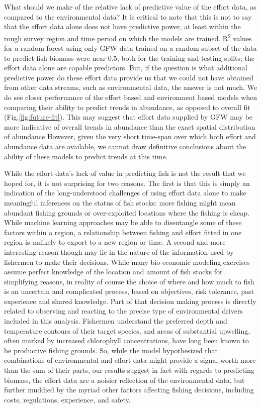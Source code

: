 \documentclass[twoside,12pt,final]{ucthesis-CA2012}
\begin{document}
\begin{ucmainmatter}
What should we make of the relative lack of predictive value of the
effort data, as compared to the environmental data? It is critical to
note that this is not to say that the effort data alone does not have
predictive power, at least within the rough survey region and time
period on which the models are trained. R\textsuperscript{2} values for
a random forest using only GFW data trained on a random subset of the
data to predict fish biomass were near 0.5, both for the training and
testing splits; the effort data alone are capable predictors. But, if
the question is what additional predictive power do these effort data
provide us that we could not have obtained from other data streams, such
as environmental data, the answer is not much. We do see closer
performance of the effort based and environment based models when
comparing their ability to predict trends in abundance, as opposed to
overall fit (Fig.\ref{fig:future-fit}). This may suggest that effort
data supplied by GFW may be more indicative of overall trends in
abundance than the exact spatial distribution of abundance However,
given the very short time-span over which both effort and abundance data
are available, we cannot draw definitive conclusions about the ability
of these models to predict trends at this time.

While the effort data's lack of value in predicting fish is not the
result that we hoped for, it is not surprising for two reasons. The
first is that this is simply an indication of the long-understood
challenges of using effort data alone to make meaningful inferences on
the status of fish stocks: more fishing might mean abundant fishing
grounds or over-exploited locations where the fishing is cheap. While
machine learning approaches may be able to disentangle some of these
factors within a region, a relationship between fishing and effort
fitted in one region is unlikely to export to a new region or time. A
second and more interesting reason though may lie in the nature of the
information used by fishermen to make their decisions. While many
bio-economic modeling exercises assume perfect knowledge of the location
and amount of fish stocks for simplifying reasons, in reality of course
the choice of where and how much to fish is an uncertain and complicated
process, based on objectives, risk tolerance, past experience and shared
knowledge. Part of that decision making process is directly related to
observing and reacting to the precise type of environmental drivers
included in this analysis. Fishermen understand the preferred depth and
temperature contours of their target species, and areas of substantial
upwelling, often marked by increased chlorophyll concentrations, have
long been known to be productive fishing grounds. So, while the model
hypothesized that combinations of environmental and effort data might
provide a signal worth more than the sum of their parts, our results
suggest in fact with regards to predicting biomass, the effort data are
a noisier reflection of the environmental data, but further muddied by
the myriad other factors affecting fishing decisions, including costs,
regulations, experience, and safety.


\end{ucmainmatter}
\end{document}

